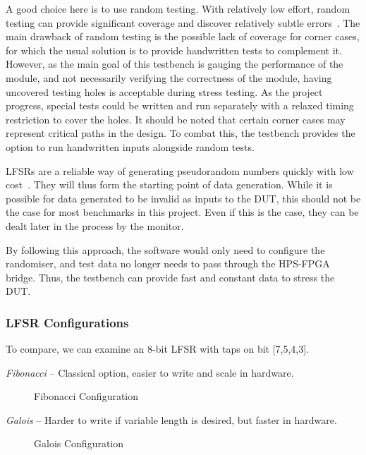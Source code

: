 A good choice here is to use random testing.
With relatively low effort, random testing can provide significant coverage and discover relatively subtle errors~\cite{Duran1}.
The main drawback of random testing is the possible lack of coverage for corner cases, for which the usual solution is to provide handwritten tests to complement it.
However, as the main goal of this testbench is gauging the performance of the module, and not necessarily verifying the correctness of the module, having uncovered testing holes is acceptable during stress testing.
As the project progress, special tests could be written and run separately with a relaxed timing restriction to cover the holes.
It should be noted that certain corner cases may represent critical paths in the design.
To combat this, the testbench provides the option to run handwritten inputs alongside random tests.

LFSRs are a reliable way of generating pseudorandom numbers quickly with low cost~\cite{Hazwani1}.
They will thus form the starting point of data generation.
While it is possible for data generated to be invalid as inputs to the DUT, this should not be the case for most benchmarks in this project.
Even if this is the case, they can be dealt later in the process by the monitor.

By following this approach, the software would only need to configure the randomiser, and test data no longer needs to pass through the HPS-FPGA bridge.
Thus, the testbench can provide fast and constant data to stress the DUT.

\subsubsection{LFSR Configurations}

To compare, we can examine an 8-bit LFSR with taps on bit [7,5,4,3].

\textit{Fibonacci} --
Classical option, easier to write and scale in hardware.

\begin{figure}[ht]
  \centering
  
  \caption{Fibonacci Configuration}
  \label{FibLFSR}
\end{figure}

\textit{Galois} --
Harder to write if variable length is desired, but faster in hardware.

\begin{figure}[ht]
  \centering
  
  \caption{Galois Configuration}
  \label{GalLFSR}
\end{figure}

